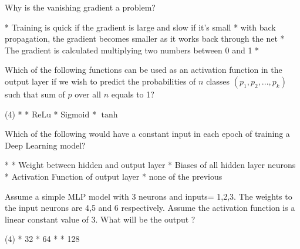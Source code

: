 \documentclass[11pt]{extarticle}
\begin{document}
\begin{exercise}
    Why is the vanishing gradient a problem?
    \begin{choice}
        * Training is quick if the gradient is large and slow if it's small
        * with back propagation, the gradient becomes smaller as it works back through the net
        * The gradient is calculated multiplying two numbers between 0 and 1
        * 
    \end{choice}
\end{exercise}
\begin{solution}
\end{solution}

\begin{exercise}
    Which of the following functions can be used as an activation function in the output layer if we wish to predict the probabilities of \(n\) classes \((p_1,p_2,...,p_k)\) such that sum of \(p\) over all \(n\) equals to 1?
    \begin{choice} (4)
        * 
        * ReLu
        * Sigmoid
        * \(\tanh\)
    \end{choice}
\end{exercise}
\begin{solution}
\end{solution}

\begin{exercise}
    Which of the following would have a constant input in each epoch of training a Deep Learning model?
    \begin{choice}
        * 
        * Weight between hidden and output layer
        * Biases of all hidden layer neurons
        * Activation Function of output layer
        * none of the previous
    \end{choice}
\end{exercise}
\begin{solution}
\end{solution}

\begin{exercise}
    Assume a simple MLP model with 3 neurons and inputs= 1,2,3. The weights to the input neurons are 4,5 and 6 respectively. Assume the activation function is a linear constant value of 3. What will be the output ?
    \begin{choice} (4)
        * 32
        * 64
        * 
        * 128
    \end{choice}
\end{exercise}
\begin{solution}
\end{solution}
\end{document}

